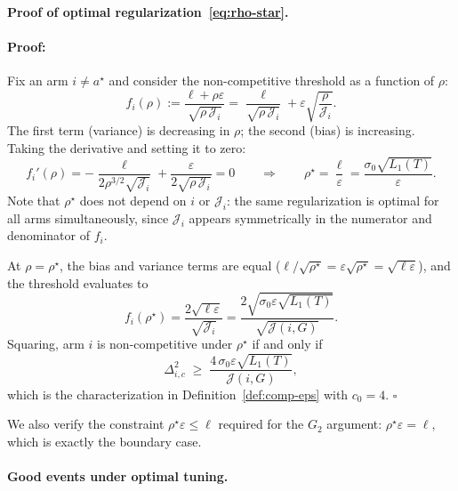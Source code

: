 \documentclass{article}
\newenvironment{proof}{\paragraph{Proof:}}{\hfill$\square$}
\begin{document}
\paragraph{Proof of optimal regularization~\eqref{eq:rho-star}.}

\begin{proof}
Fix an arm $i\neq a^\star$ and consider the non-competitive threshold as a
function of $\rho$:
\[
f_i(\rho)
:=
\frac{\ell+\rho\varepsilon}{\sqrt{\rho\,\mathcal J_i}}
=
\frac{\ell}{\sqrt{\rho\,\mathcal J_i}}
+
\varepsilon\sqrt{\frac{\rho}{\mathcal J_i}}.
\]
The first term (variance) is decreasing in $\rho$; the second (bias) is
increasing. Taking the derivative and setting it to zero:
\[
f_i'(\rho)
=
-\frac{\ell}{2\rho^{3/2}\sqrt{\mathcal J_i}}
+\frac{\varepsilon}{2\sqrt{\rho\,\mathcal J_i}}
=0
\qquad\Longrightarrow\qquad
\rho^\star
=
\frac{\ell}{\varepsilon}
=
\frac{\sigma_0\sqrt{L_1(T)}}{\varepsilon}.
\]
Note that $\rho^\star$ does not depend on $i$ or $\mathcal J_i$: the same
regularization is optimal for all arms simultaneously, since $\mathcal J_i$
appears symmetrically in the numerator and denominator of $f_i$.

At $\rho=\rho^\star$, the bias and variance terms are equal
($\ell/\sqrt{\rho^\star}=\varepsilon\sqrt{\rho^\star}=\sqrt{\ell\varepsilon}$),
and the threshold evaluates to
\[
f_i(\rho^\star)
=
\frac{2\sqrt{\ell\varepsilon}}{\sqrt{\mathcal J_i}}
=
\frac{2\sqrt{\sigma_0\varepsilon\sqrt{L_1(T)}}}{\sqrt{\mathcal J(i,G)}}.
\]
Squaring, arm $i$ is non-competitive under $\rho^\star$ if and only if
\[
\Delta_{i,c}^2
\;\ge\;
\frac{4\,\sigma_0\varepsilon\sqrt{L_1(T)}}{\mathcal J(i,G)},
\]
which is the characterization in Definition~\ref{def:comp-eps} with
$c_0=4$.
\end{proof}

We also verify the constraint $\rho^\star\varepsilon\le\ell$ required for the
$G_2$ argument: $\rho^\star\varepsilon=\ell$, which is exactly the
boundary case.

\paragraph{Good events under optimal tuning.}
\end{document}
